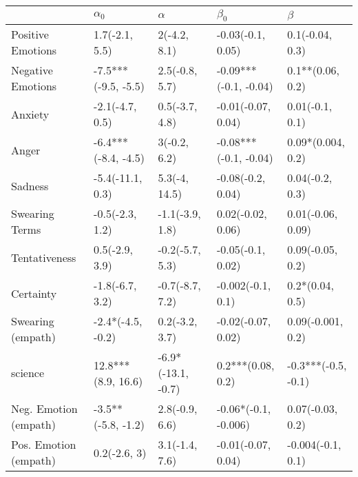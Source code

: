 \begin{tabular}{lllll}
\toprule
{} &           $\alpha_0$ &            $\alpha$ &              $\beta_0$ &              $\beta$ \\
\midrule
Positive Emotions     &       1.7(-2.1, 5.5) &        2(-4.2, 8.1) &      -0.03(-0.1, 0.05) &      0.1(-0.04, 0.3) \\
Negative Emotions     &  -7.5***(-9.5, -5.5) &      2.5(-0.8, 5.7) &  -0.09***(-0.1, -0.04) &     0.1**(0.06, 0.2) \\
Anxiety               &      -2.1(-4.7, 0.5) &      0.5(-3.7, 4.8) &     -0.01(-0.07, 0.04) &      0.01(-0.1, 0.1) \\
Anger                 &  -6.4***(-8.4, -4.5) &        3(-0.2, 6.2) &  -0.08***(-0.1, -0.04) &    0.09*(0.004, 0.2) \\
Sadness               &     -5.4(-11.1, 0.3) &       5.3(-4, 14.5) &      -0.08(-0.2, 0.04) &      0.04(-0.2, 0.3) \\
Swearing Terms        &      -0.5(-2.3, 1.2) &     -1.1(-3.9, 1.8) &      0.02(-0.02, 0.06) &    0.01(-0.06, 0.09) \\
Tentativeness         &       0.5(-2.9, 3.9) &     -0.2(-5.7, 5.3) &      -0.05(-0.1, 0.02) &     0.09(-0.05, 0.2) \\
Certainty             &      -1.8(-6.7, 3.2) &     -0.7(-8.7, 7.2) &      -0.002(-0.1, 0.1) &      0.2*(0.04, 0.5) \\
Swearing (empath)     &    -2.4*(-4.5, -0.2) &      0.2(-3.2, 3.7) &     -0.02(-0.07, 0.02) &    0.09(-0.001, 0.2) \\
science               &   12.8***(8.9, 16.6) &  -6.9*(-13.1, -0.7) &      0.2***(0.08, 0.2) &  -0.3***(-0.5, -0.1) \\
Neg. Emotion (empath) &   -3.5**(-5.8, -1.2) &      2.8(-0.9, 6.6) &   -0.06*(-0.1, -0.006) &     0.07(-0.03, 0.2) \\
Pos. Emotion (empath) &         0.2(-2.6, 3) &      3.1(-1.4, 7.6) &     -0.01(-0.07, 0.04) &    -0.004(-0.1, 0.1) \\
\bottomrule
\end{tabular}
